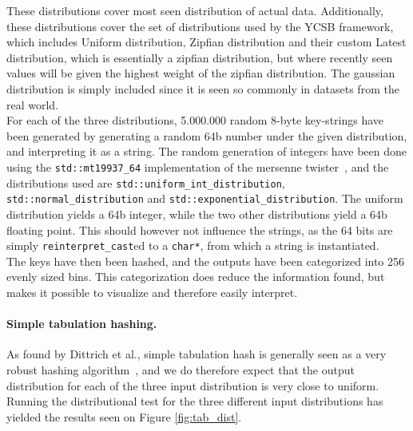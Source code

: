 \documentclass[11pt]{article} %
\begin{document}
These distributions cover most seen distribution of actual data. Additionally, these distributions cover the set of distributions used by the YCSB framework, which includes Uniform distribution, Zipfian distribution and their custom Latest distribution, which is essentially a zipfian distribution, but where recently seen values will be given the highest weight of the zipfian distribution. The gaussian distribution is simply included since it is seen so commonly in datasets from the real world.\\

For each of the three distributions, 5.000.000 random 8-byte key-strings have been generated by generating a random 64b number under the given distribution, and interpreting it as a string. The random generation of integers have been done using the \verb|std::mt19937_64| implementation of the mersenne twister~\cite{wiki_MT}, and the distributions used are \verb|std::uniform_int_distribution|, \verb|std::normal_distribution| and \verb|std::exponential_distribution|. The uniform distribution yields a 64b integer, while the two other distributions yield a 64b floating point. This should however not influence the strings, as the 64 bits are simply \verb|reinterpret_cast|ed to a \verb|char*|, from which a string is instantiated.\\

The keys have then been hashed, and the outputs have been categorized into 256 evenly sized bins. This categorization does reduce the information found, but makes it possible to visualize and therefore easily interpret.

\paragraph{Simple tabulation hashing.} As found by Dittrich et al., simple tabulation hash is generally seen as a very robust hashing algorithm~\cite{RAD15}, and we do therefore expect that the output distribution for each of the three input distribution is very close to uniform. \\

Running the distributional test for the three different input distributions has yielded the results seen on Figure \ref{fig:tab_dist}.\\
\end{document}

